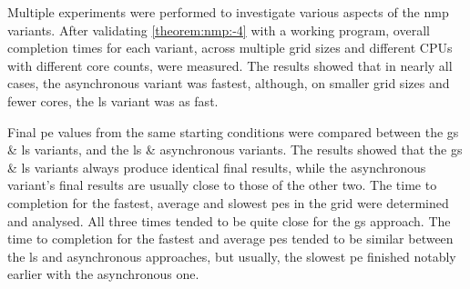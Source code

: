 Multiple experiments were performed to investigate various aspects of the \gls{nmp} variants.  After validating \cref{theorem:nmp:-4} with a working program, overall completion times for each variant, across multiple grid sizes and different CPUs with different core counts, were measured.  The results showed that in nearly all cases, the asynchronous variant was fastest, although, on smaller grid sizes and fewer cores, the \gls{ls} variant was as fast.

Final \gls{pe} values from the same starting conditions were compared between the \gls{gs} \& \gls{ls} variants, and the \gls{ls} \& asynchronous variants.  The results showed that the \gls{gs} \& \gls{ls} variants always produce identical final results, while the asynchronous variant's final results are usually close to those of the other two.  The time to completion for the fastest, average and slowest \glspl{pe} in the grid were determined and analysed.  All three times tended to be quite close for the \gls{gs} approach.  The time to completion for the fastest and average \glspl{pe} tended to be similar between the \gls{ls} and asynchronous approaches, but usually, the slowest \gls{pe} finished notably earlier with the asynchronous one.